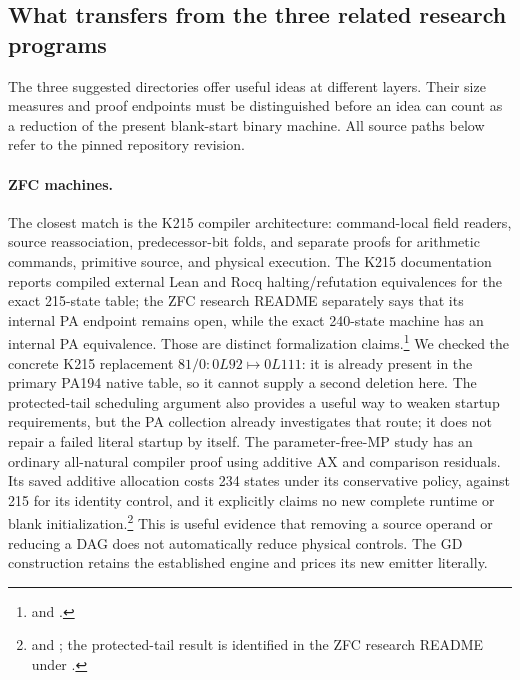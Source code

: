\subsection{What transfers from the three related research programs}
\label{sec:theory-transfer}

The three suggested directories offer useful ideas at different layers.
Their size measures and proof endpoints must be distinguished before an
idea can count as a reduction of the present blank-start binary machine.
All source paths below refer to the pinned repository revision.

\paragraph{ZFC machines.}
The closest match is the K215 compiler architecture: command-local field
readers, source reassociation, predecessor-bit folds, and separate proofs
for arithmetic commands, primitive source, and physical execution.
The K215 documentation reports compiled external Lean and Rocq
halting/refutation equivalences for the exact 215-state table; the ZFC
research README separately says that its internal PA endpoint remains
open, while the exact 240-state machine has an internal PA equivalence.
Those are distinct formalization claims.\footnote{\raggedright{}
and .}
We checked the concrete K215 replacement
$81/0:0L92\mapsto0L111$: it is already present in the primary PA194
native table, so it cannot supply a second deletion here. The
protected-tail scheduling argument also provides a useful way to weaken
startup requirements, but the PA collection already investigates that
route; it does not repair a failed literal startup by itself.
The parameter-free-MP study has an ordinary all-natural compiler proof
using additive AX and comparison residuals. Its saved additive allocation
costs 234 states under its conservative policy, against 215 for its
identity control, and it explicitly claims no new complete runtime or
blank initialization.\footnote{\raggedright{}
and ;
the protected-tail result is identified in the ZFC research README under
.}
This is useful evidence that removing a source operand or reducing a DAG
does not automatically reduce physical controls. The GD construction
retains the established engine and prices its new emitter literally.

